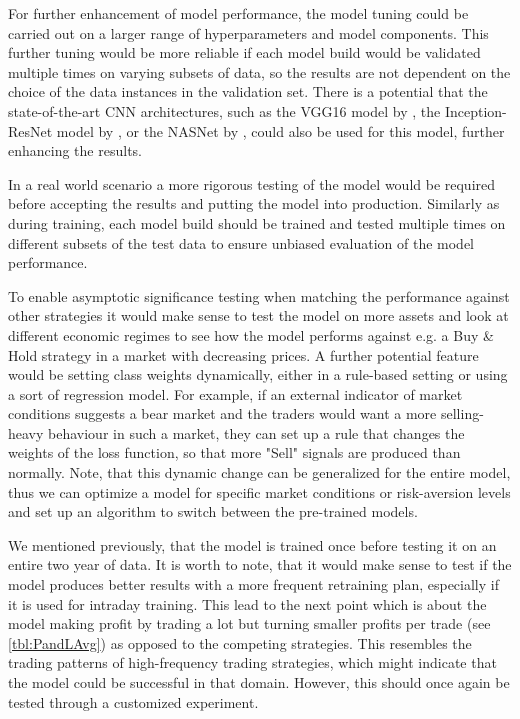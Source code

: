 \documentclass[11pt, a4paper]{article}
\begin{document}
For further enhancement of model performance, the model tuning could be carried out on a larger range of hyperparameters and model components. This further tuning would be more reliable if each model build would be validated multiple times on varying subsets of data, so the results are not dependent on the choice of the data instances in the validation set. There is a potential that the state-of-the-art CNN architectures, such as the VGG16 model by \cite{simonyan2014very}, the Inception-ResNet model by \cite{szegedy2016inception}, or the NASNet by \cite{zoph2018learning}, could also be used for this model, further enhancing the results.

In a real world scenario a more rigorous testing of the model would be required before accepting the results and putting the model into production. Similarly as during training, each model build should be trained and tested multiple times on different subsets of the test data to ensure unbiased evaluation of the model performance.

To enable asymptotic significance testing when matching the performance against other strategies it would make sense to test the model on more assets and look at different economic regimes to see how the model performs against e.g. a Buy \& Hold strategy in a market with decreasing prices. A further potential feature would be setting class weights dynamically, either in a rule-based setting or using a sort of regression model. For example, if an external indicator of market conditions suggests a bear market and the traders would want a more selling-heavy behaviour in such a market, they can set up a rule that changes the weights of the loss function, so that more "Sell" signals are produced than normally. Note, that this dynamic change can be generalized for the entire model, thus we can optimize a model for specific market conditions or risk-aversion levels and set up an algorithm to switch between the pre-trained models.

We mentioned previously, that the model is trained once before testing it on an entire two year of data. It is worth to note, that it would make sense to test if the model produces better results with a more frequent retraining plan, especially if it is used for intraday training. This lead to the next point which is about the model making profit by trading a lot but turning smaller profits per trade (see \ref{tbl:PandLAvg}) as opposed to the competing strategies. This resembles the trading patterns of high-frequency trading strategies, which might indicate that the model could be successful in that domain. However, this should once again be tested through a customized experiment.
\end{document}
